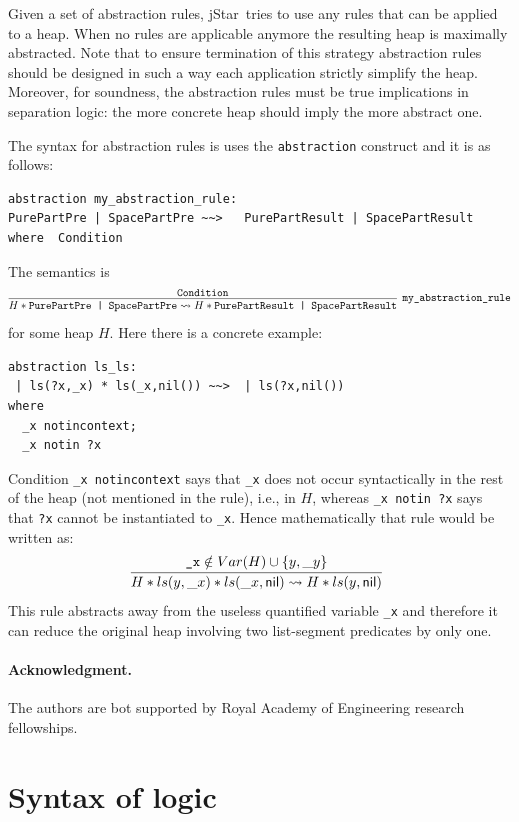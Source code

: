 \documentclass[11pt]{article}
\newcommand{\jStar}{{\sf jStar}}
\newcommand{\nil}{{\sf nil}}
\begin{document}
Given a set of abstraction rules, \jStar \  tries to use
any rules that can be applied to a heap. When no rules are applicable
anymore the resulting heap is maximally abstracted. 
Note that to ensure termination of this strategy abstraction rules should be designed in 
such a way each application strictly simplify the heap.
Moreover, for soundness, the abstraction rules must
be true implications in separation logic: the more concrete heap
should imply the more abstract one.

The syntax for abstraction rules is uses the {\tt abstraction} construct and it is as follows:
\begin{verbatim}
abstraction my_abstraction_rule:
PurePartPre | SpacePartPre ~~>   PurePartResult | SpacePartResult    
where  Condition
\end{verbatim}
The semantics  is
\[
\infer[\texttt{my\_abstraction\_rule}]
{H* \texttt{PurePartPre | SpacePartPre} \leadsto H*\texttt{PurePartResult | SpacePartResult} }{\texttt{Condition}}
\] for some heap $H$. Here there is a concrete example:
\begin{verbatim}
abstraction ls_ls:
 | ls(?x,_x) * ls(_x,nil()) ~~>  | ls(?x,nil())
where 
  _x notincontext;
  _x notin ?x
\end{verbatim}
Condition {\tt \_x notincontext} says that {\tt \_x} does not occur syntactically in the rest of the heap (not mentioned in the rule), i.e., in $H$, whereas {\tt \_x notin ?x} says that {\tt ?x} cannot be instantiated to {\tt \_x}. Hence mathematically that rule would be written as:
\[
\infer[]
{H*ls(y,\_x)*ls(\_x,\nil) \leadsto H*ls(y,\nil)}
{\texttt{\_x} \notin Var(H) \cup \{y,\_y \} }
\] This rule abstracts away from the useless quantified variable {\tt \_x} and therefore it can reduce the original heap involving two list-segment predicates by only one.

\paragraph{Acknowledgment.}
The authors are bot supported by Royal Academy of Engineering research fellowships.




\appendix 
\section{Syntax of logic}
\end{document}
